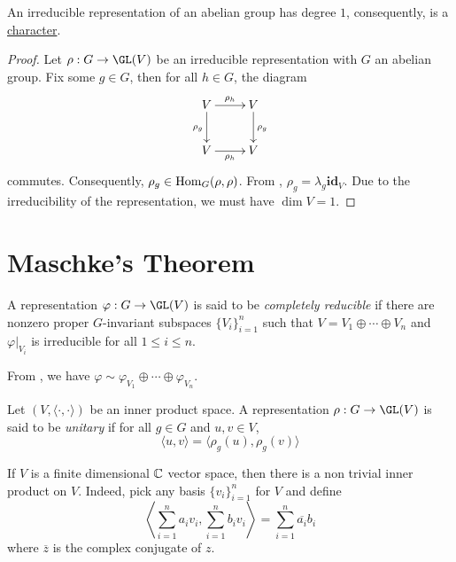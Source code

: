 \begin{corollary}
    An irreducible representation of an abelian group has degree $1$, consequently, is a \underline{character}.
\end{corollary}
\begin{proof}
    Let $\rho: G\to\GL(V)$ be an irreducible representation with $G$ an abelian group. Fix some $g\in G$, then for all $h\in G$, the diagram 
    \begin{equation*}
        \xymatrix{
            V\ar[r]^{\rho_h}\ar[d]_{\rho_g} & V\ar[d]^{\rho_g}\\
            V\ar[r]_{\rho_h} & V
        }
    \end{equation*}
    commutes. Consequently, $\rho_g\in\operatorname{Hom}_G(\rho,\rho)$. From , $\rho_g = \lambda_g\mathbf{id}_V$. Due to the irreducibility of the representation, we must have $\dim V = 1$.
\end{proof}

\section{Maschke's Theorem}

\begin{definition}
    A representation $\varphi: G\to\GL(V)$ is said to be \textit{completely reducible} if there are nonzero proper $G$-invariant subspaces $\{V_i\}_{i = 1}^n$ such that $V = V_1\oplus\cdots\oplus V_n$ and $\varphi|_{V_i}$ is irreducible for all $1\le i\le n$.
\end{definition}

From , we have $\varphi\sim\varphi_{V_1}\oplus\cdots\oplus\varphi_{V_n}$.

\begin{definition}
    Let $(V,\langle\cdot,\cdot\rangle)$ be an inner product space. A representation $\rho: G\to\GL(V)$ is said to be \textit{unitary} if for all $g\in G$ and $u,v\in V$, 
    \begin{equation*}
        \langle u,v\rangle = \langle\rho_g(u),\rho_g(v)\rangle
    \end{equation*}
\end{definition}

\begin{remark}
    If $V$ is a finite dimensional $\mathbb{C}$ vector space, then there is a non trivial inner product on $V$. Indeed, pick any basis $\{v_i\}_{i = 1}^n$ for $V$ and define 
    \begin{equation*}
        \left\langle\sum_{i = 1}^na_iv_i, \sum_{i = 1}^n b_iv_i\right\rangle = \sum_{i = 1}^n\overline{a_i}b_i
    \end{equation*}
    where $\overline z$ is the complex conjugate of $z$.
\end{remark}

